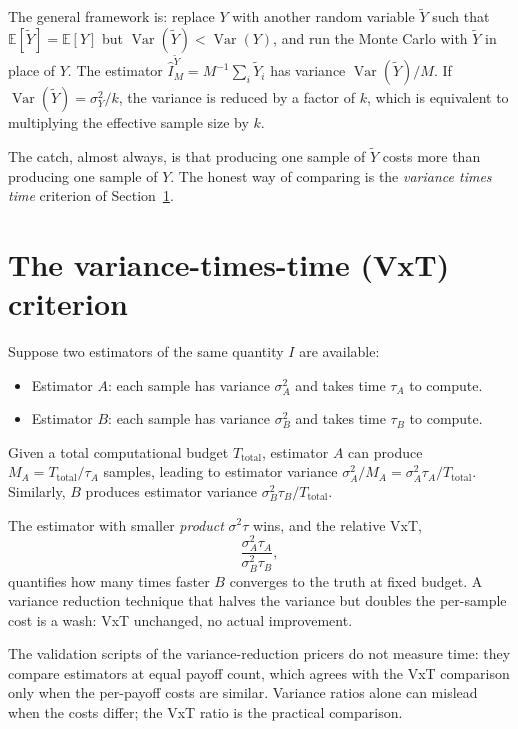 \documentclass[11pt,a4paper]{article}
\theoremstyle{plain}
\theoremstyle{definition}
\theoremstyle{remark}
\newcommand{\E}{\mathbb{E}}
\newcommand{\Var}{\operatorname{Var}}
\begin{document}
The general framework is: replace $Y$ with another random variable
$\tilde Y$ such that $\E[\tilde Y] = \E[Y]$ but $\Var(\tilde Y) <
\Var(Y)$, and run the Monte Carlo with $\tilde Y$ in place of $Y$.
The estimator $\hat I_M^{\tilde Y} = M^{-1} \sum_i \tilde Y_i$ has
variance $\Var(\tilde Y) / M$. If $\Var(\tilde Y) = \sigma^2_Y / k$,
the variance is reduced by a factor of $k$, which is equivalent to
multiplying the effective sample size by $k$.

The catch, almost always, is that producing one sample of $\tilde Y$
costs more than producing one sample of $Y$. The honest way of
comparing is the \emph{variance times time} criterion of
Section~\ref{sec:vxt}.

\section{The variance-times-time (VxT) criterion}
\label{sec:vxt}

Suppose two estimators of the same quantity $I$ are available:
\begin{itemize}
\item Estimator $A$: each sample has variance $\sigma_A^2$ and takes
time $\tau_A$ to compute.
\item Estimator $B$: each sample has variance $\sigma_B^2$ and takes
time $\tau_B$ to compute.
\end{itemize}
Given a total computational budget $T_{\text{total}}$, estimator $A$
can produce $M_A = T_{\text{total}} / \tau_A$ samples, leading to
estimator variance $\sigma_A^2 / M_A = \sigma_A^2 \tau_A /
T_{\text{total}}$. Similarly, $B$ produces estimator variance
$\sigma_B^2 \tau_B / T_{\text{total}}$.

The estimator with smaller \emph{product} $\sigma^2 \tau$ wins, and
the relative VxT,
\begin{equation}
\frac{\sigma_A^2 \tau_A}{\sigma_B^2 \tau_B},
\end{equation}
quantifies how many times faster $B$ converges to the truth at fixed
budget. A variance reduction technique that halves the variance but
doubles the per-sample cost is a wash: VxT unchanged, no actual
improvement.

The validation scripts of the variance-reduction pricers do not
measure time: they compare estimators at equal payoff count, which
agrees with the VxT comparison only when the per-payoff costs are
similar. Variance ratios alone can mislead when the costs differ;
the VxT ratio is the practical comparison.
\end{document}
